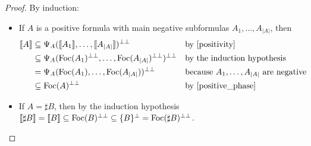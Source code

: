 \documentclass[11pt]{article}
\newcommand\size[1]{{\lvert #1 \rvert}}
\newcommand\sem[1]{{\llbracket #1 \rrbracket}}
\newcommand\biperp{{\perp\perp}}
\newcommand\Foc{\textup{Foc}}
\begin{document}
\begin{proof}
    By induction:
    \begin{itemize}
        \item If $A$ is a positive formula with main negative subformulas $A_1, \dots, A_\size{A}$, then \begin{align*}
            \sem{A}
            &\subseteq \Psi_A(\sem{A_1}, \dots, \sem{A_\size{A}})^\biperp &&\text{by \cref{positivity}} \\
            &\subseteq \Psi_A(\Foc(A_1)^\biperp, \dots, \Foc(A_\size{A})^\biperp)^\biperp &&\text{by the induction hypothesis} \\
            &= \Psi_A(\Foc(A_1), \dots, \Foc(A_\size{A}))^\biperp &&\text{because $A_1,\dots,A_\size{A}$ are negative} \\
            &\subseteq \Foc(A)^\biperp &&\text{by \cref{positive_phase}}
        \end{align*}
        \item If $A = \sharp B$, then by the induction hypothesis
        $\sem{\sharp B} = \sem{B} \subseteq \Foc(B)^\biperp \subseteq \{B\}^\perp = \Foc(\sharp B)^\biperp$.


\end{itemize}
\end{proof}
\end{document}
